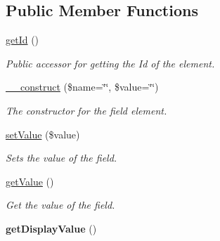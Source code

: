 \subsection*{Public Member Functions}
\begin{DoxyCompactItemize}
\item 
\hypertarget{class_field_ae50205a56f3df7580c448b8de6009937}{
\hyperlink{class_field_ae50205a56f3df7580c448b8de6009937}{getId} ()}
\label{class_field_ae50205a56f3df7580c448b8de6009937}

\begin{DoxyCompactList}\small\item\em Public accessor for getting the Id of the element. \item\end{DoxyCompactList}\item 
\hypertarget{class_field_af944a4e49cf005ffb2683ae41893f45a}{
\hyperlink{class_field_af944a4e49cf005ffb2683ae41893f45a}{\_\-\_\-construct} (\$name=\char`\"{}\char`\"{}, \$value=\char`\"{}\char`\"{})}
\label{class_field_af944a4e49cf005ffb2683ae41893f45a}

\begin{DoxyCompactList}\small\item\em The constructor for the field element. \item\end{DoxyCompactList}\item 
\hyperlink{class_field_a71850d0cc96eeb649e4e62b040c6fa97}{setValue} (\$value)
\begin{DoxyCompactList}\small\item\em Sets the value of the field. \item\end{DoxyCompactList}\item 
\hyperlink{class_field_aa2a5387191aa04a20d0b0d48bf7bf8e9}{getValue} ()
\begin{DoxyCompactList}\small\item\em Get the value of the field. \item\end{DoxyCompactList}\item 
\hypertarget{class_field_aecae15cf0a616e67888a200a609c6a50}{
{\bfseries getDisplayValue} ()}
\label{class_field_aecae15cf0a616e67888a200a609c6a50}


\end{DoxyCompactItemize}
